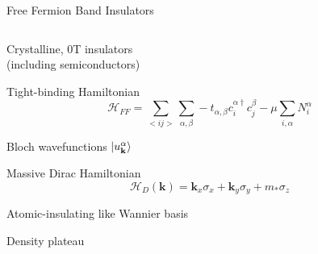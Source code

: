 \newcommand{\kk}{\mathbf{k}}
\begin{frame}{Free Fermion Band Insulators}
\vskip-1.5cm
\begin{columns}[T]
\begin{column}[T]{0.65\textwidth}
\bi 
\item Crystalline, 0T insulators \\(including semiconductors)
\item Tight-binding Hamiltonian 
$$
\mathcal{H}_{FF} =  \sum\limits_{<ij>}\sum\limits_{\alpha, \beta}-t_{\alpha, \beta} c^{\alpha \dagger}_{i} c_{j}^{\beta} - \mu \sum\limits_{i, \alpha} N_{i}^{\alpha} 
$$
\item Bloch wavefunctions
$
\ket{u^{\alpha}_{\kk}}
$
\item Massive Dirac Hamiltonian 
$$
\mathcal{H}_{D}(\kk) = \kk_x \sigma_x + \kk_y \sigma_y + m_*\sigma_z
$$
\item Atomic-insulating like Wannier basis
\item Density plateau
\ei 
\end{column}


\end{columns}
\end{frame}
